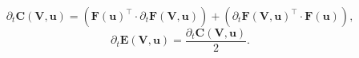 \documentclass[preview]{standalone}
\let\oldcdot\cdot
\let\cdot\oldcdot
\begin{document}
\begin{dmath*}
\partial_{t} \mathbf C({\mathbf V},{\mathbf{ u }}) = \left(  \mathbf F({\mathbf{ u }})^\top  \cdot \partial_{t} \mathbf F({\mathbf V},{\mathbf{ u }}) \right) + \left(  \partial_{t} \mathbf F({\mathbf V},{\mathbf{ u }})^\top  \cdot \mathbf F({\mathbf{ u }}) \right),
 \end{dmath*}
\begin{dmath*}
\partial_{t} \mathbf E({\mathbf V},{\mathbf{ u }}) = \frac{\partial_{t} \mathbf C({\mathbf V},{\mathbf{ u }})}{2}.
 \end{dmath*}
\end{document}
